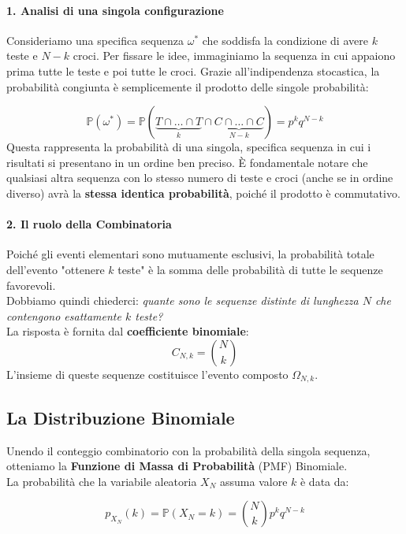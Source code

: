 \paragraph{1. Analisi di una singola configurazione}
Consideriamo una specifica sequenza $\omega^*$ che soddisfa la condizione di avere $k$ teste e $N-k$ croci. Per fissare le idee, immaginiamo la sequenza in cui appaiono prima tutte le teste e poi tutte le croci. Grazie all'indipendenza stocastica, la probabilità congiunta è semplicemente il prodotto delle singole probabilità:

\[
\mathbb{P}(\omega^*) = \mathbb{P}(\underbrace{T \cap \dots \cap T}_{k} \cap \underbrace{C \cap \dots \cap C}_{N-k}) = p^k q^{N-k}
\]
Questa rappresenta la probabilità di una singola, specifica sequenza in cui i risultati si presentano in un ordine ben preciso.
È fondamentale notare che qualsiasi altra sequenza con lo stesso numero di teste e croci (anche se in ordine diverso) avrà la \textbf{stessa identica probabilità}, poiché il prodotto è commutativo.

\paragraph{2. Il ruolo della Combinatoria}
Poiché gli eventi elementari sono mutuamente esclusivi, la probabilità totale dell'evento "ottenere $k$ teste" è la somma delle probabilità di tutte le sequenze favorevoli.
\\Dobbiamo quindi chiederci: \textit{quante sono le sequenze distinte di lunghezza $N$ che contengono esattamente $k$ teste?}
\\La risposta è fornita dal \textbf{coefficiente binomiale}:
\[ C_{N,k} = \binom{N}{k} \]
L'insieme di queste sequenze costituisce l'evento composto $\Omega_{N,k}$.

\subsection{La Distribuzione Binomiale}

Unendo il conteggio combinatorio con la probabilità della singola sequenza, otteniamo la \textbf{Funzione di Massa di Probabilità} (PMF) Binomiale.
\\La probabilità che la variabile aleatoria $X_N$ assuma valore $k$ è data da:

\begin{equation}
\boxed{p_{X_N}(k) = \mathbb{P}(X_N = k) = \binom{N}{k} p^k q^{N-k}}
\end{equation}

